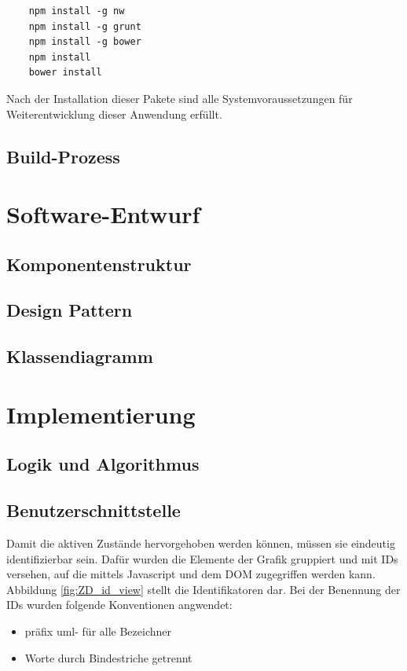 \begin{lstlisting}
	npm install -g nw
	npm install -g grunt
	npm install -g bower
	npm install
	bower install
\end{lstlisting}

Nach der Installation dieser Pakete sind alle Systemvoraussetzungen für Weiterentwicklung dieser Anwendung erfüllt. 

\section{Build-Prozess}


\chapter{Software-Entwurf}
\section{Komponentenstruktur}

\section{Design Pattern}

\section{Klassendiagramm}


\chapter{Implementierung}
\section{Logik und Algorithmus}

\section{Benutzerschnittstelle}
Damit die aktiven Zustände hervorgehoben werden können, müssen sie eindeutig identifizierbar sein. Dafür wurden die Elemente der Grafik gruppiert und mit IDs versehen, auf die mittels Javascript und dem \acrshort{DOM} zugegriffen werden kann. Abbildung \ref{fig:ZD_id_view} stellt die Identifikatoren dar. Bei der Benennung der IDs wurden folgende Konventionen angwendet:
\begin{itemize}
	\item präfix uml- für alle Bezeichner
	\item Worte durch Bindestriche getrennt
\end{itemize}

